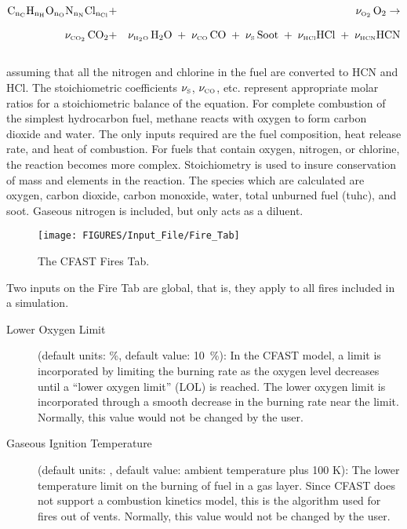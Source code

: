 \begin{eqnarray}
   \mathrm{C_{n_{\tiny \hbox{C}}}H_{n_H}O_{n_O}N_{n_N}Cl_{n_{Cl}}} &+&  \nu_{\tiny \hbox{O}_2} \, \mathrm{O_2}  \rightarrow  \nonumber \\[.1in]
   \nu_{\tiny \hbox{CO}_2} \, \mathrm{CO_2} &+& \nu_{\tiny \hbox{H}_2\hbox{O}} \, \mathrm{H_2O} \; + \; \nu_{\tiny \hbox{CO}} \, \mathrm{CO} \; + \; \nu_{\tiny \hbox{S}} \, \mathrm{Soot} \; + \; \nu_{\tiny \hbox{HCl}} \mathrm{HCl} \; + \; \nu_{\tiny \hbox{HCN}} \mathrm{HCN} \label{stoich}
\end{eqnarray} \\
assuming that all the nitrogen and chlorine in the fuel are converted to HCN and HCl. The stoichiometric coefficients $\nu_{\tiny \hbox{S}}$, $\nu_{\tiny \hbox{CO}}$, etc. represent appropriate molar ratios for a stoichiometric balance of the equation. For complete combustion of the simplest hydrocarbon fuel, methane reacts with oxygen to form carbon dioxide and water. The only inputs required are the fuel composition, heat release rate, and heat of combustion. For fuels that contain oxygen, nitrogen, or chlorine, the reaction becomes more complex. Stoichiometry is used to insure conservation of mass and elements in the reaction. The species which are calculated are oxygen, carbon dioxide, carbon monoxide, water, total unburned fuel (tuhc), and soot. Gaseous nitrogen is included, but only acts as a diluent.

\begin{figure}[h!]
\begin{center}
\texttt{[image: FIGURES/Input\_File/Fire\_Tab]}
\caption[The CFAST Fires Tab]{The CFAST Fires Tab.}
\end{center}
\end{figure}

Two inputs on the Fire Tab are global, that is, they apply to all fires included in a simulation.
\begin{description}
\item[Lower Oxygen Limit] (default units: \%, default value: 10~\%):  In the CFAST model, a limit is incorporated by limiting the burning rate as the oxygen level decreases until a ``lower oxygen limit'' (LOL) is reached. The lower oxygen limit is incorporated through a smooth decrease in the burning rate near the limit. Normally, this value would not be changed by the user.

\item[Gaseous Ignition Temperature] (default units: \degc, default value: ambient temperature plus 100 K): The lower temperature limit on the burning of fuel in a gas layer. Since CFAST does not support a combustion kinetics model, this is the algorithm used for fires out of vents.  Normally, this value would not be changed by the user.
\end{description}

